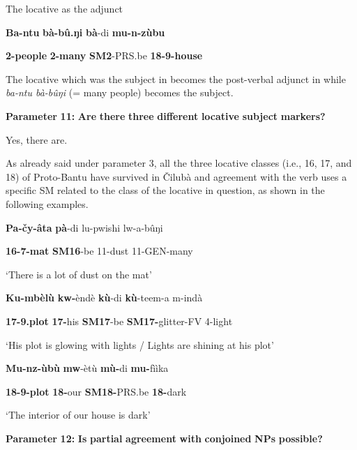 \documentclass[output=paper]{langscibook}
\begin{document}
\ea%
    \label{ex:lukusa:83}
    \z

          The locative as the adjunct

\textbf{Ba-ntu}    \textbf{bà-bû.ŋi}    \textbf{bà}{}-di        \textbf{mu-n-zùbu}

\textbf{2-people}  \textbf{2-many}    \textbf{SM2}{}-PRS.be  \textbf{18-9-house}  

The locative which was the subject in  becomes the post-verbal adjunct in  while \textit{ba-ntu bà-bûŋi} (= many people) becomes the subject.

\textbf{Parameter} \textbf{11:} \textbf{Are} \textbf{there} \textbf{three} \textbf{different} \textbf{locative} \textbf{subject} \textbf{markers?}

Yes, there are.

As already said under parameter 3, all the three locative classes (i.e., 16, 17, and 18) of Proto-Bantu have survived in Čilubà and agreement with the verb uses a specific SM related to the class of the locative in question, as shown in the following examples.

\ea%
    \label{ex:lukusa:84}
    \z

           \textbf{Pa-}{\textbf{č}}\textbf{y-âta}    \textbf{pà}{}-di      lu-pwishi  lw-a-bûŋi

\textbf{16-7-mat}    \textbf{SM16}{}-be  11-dust    11-GEN-many

\glt ‘There is a lot of dust on the mat’

\ea%
    \label{ex:lukusa:85}
    \z

           \textbf{Ku-mbèlù}    \textbf{kw-}èndè    \textbf{kù}{}-di      \textbf{kù}{}-teem-a        m-indà

\textbf{17-9.plot}    \textbf{17-}his      \textbf{SM17}{}-be  \textbf{SM17-}glitter-FV    4-light

\glt ‘His plot is glowing with lights / Lights are shining at his plot’

\ea%
    \label{ex:lukusa:86}
    \z

          \textbf{Mu-nz-ùbù}    \textbf{mw}{}-ètù    \textbf{mù-}di        \textbf{mu-}fììka

\textbf{18-9-plot}    \textbf{18-}our    \textbf{SM18-}PRS.be    \textbf{18-}dark

\glt ‘The interior of our house is dark’

\textbf{Parameter} \textbf{12:} \textbf{Is} \textbf{partial} \textbf{agreement} \textbf{with} \textbf{conjoined} \textbf{NPs} \textbf{possible?}
\end{document}
